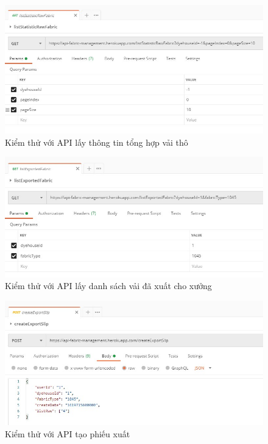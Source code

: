 \begin{figure}[H]
    \begin{center}
        \includegraphics[width=12cm]{Image/API/21_listStatisticRawFabric.jpg}
        \caption{Kiểm thử với API lấy thông tin tổng hợp vải thô}
        \label{listStatisticRawFabric}
    \end{center}
\end{figure}
\begin{figure}[H]
    \begin{center}
        \includegraphics[width=12cm]{Image/API/22_listExportedFabric.jpg}
        \caption{Kiểm thử với API lấy danh sách vải đã xuất cho xưởng}
        \label{listExportedFabric}
    \end{center}
\end{figure}
\begin{figure}[H]
    \begin{center}
        \includegraphics[width=12cm]{Image/API/23_createExportSlip.jpg}
        \caption{Kiểm thử với API tạo phiếu xuất}
        \label{createExportSlip}
    \end{center}
\end{figure}


